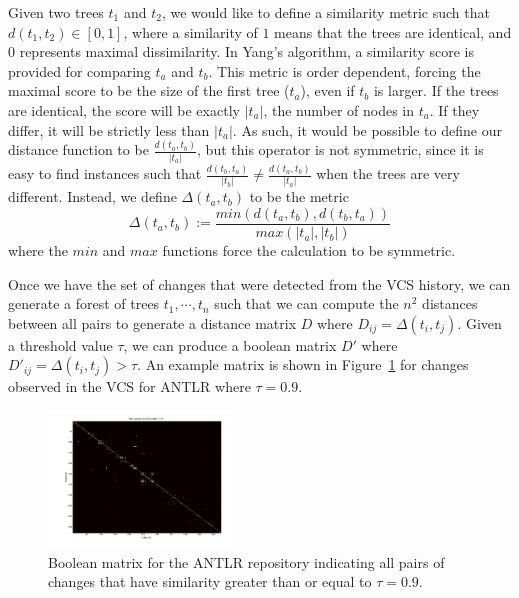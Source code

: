 Given two trees $t_1$ and $t_2$, we would like to define a similarity metric
such that $d(t_1, t_2) \in [0,1]$, where a similarity of $1$ means that the
trees are identical, and $0$ represents maximal dissimilarity.  In Yang's
algorithm, a similarity score is provided for comparing $t_a$ and $t_b$. This
metric is order dependent, forcing the maximal score to be the size of the
first tree ($t_a$), even if $t_b$ is larger.  If the trees are identical, the
score will be exactly $|t_a|$, the number of nodes in $t_a$.  If they differ,
it will be strictly less than $|t_a|$.  As such, it would be possible to define
our distance function to be $\frac{d(t_a, t_b)}{|t_a|}$, but this operator is
not symmetric, since it is easy to find instances such that $\frac{d(t_b,
t_a)}{|t_b|} \neq \frac{d(t_a, t_b)}{|t_a|}$ when the trees are very different.
Instead, we define $\Delta(t_a, t_b)$ to be the metric
$$\Delta(t_a, t_b) := \frac{min(d(t_a, t_b),d(t_b, t_a))}{max(|t_a|,|t_b|)}$$
where the $min$ and $max$ functions force the calculation to be symmetric.

Once we have the set of changes that were detected from the VCS history,
we can generate a forest of trees $t_1, \cdots, t_n$ such that we can
compute the $n^2$ distances between all pairs to generate a distance matrix
$D$ where $D_{ij} = \Delta(t_i, t_j)$.  Given a threshold value $\tau$, we can
produce a boolean matrix $D'$ where $D'_{ij} = \Delta(t_i, t_j) > \tau$.  An
example matrix is shown in Figure~\ref{fig:boolmat} for changes observed
in the VCS for ANTLR where $\tau = 0.9$.  

\begin{figure}
\begin{center}
\includegraphics[width=0.45\textwidth]{figures/distmatrix-0-9.png}
\caption{Boolean matrix for the ANTLR repository indicating all pairs of
changes that have similarity greater than or equal to $\tau = 0.9$.}
\label{fig:boolmat}
\end{center}
\end{figure}

